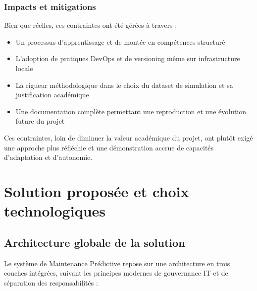 \documentclass[a4paper,12pt,twoside]{report}
\begin{document}
\subsection{Impacts et mitigations}

Bien que réelles, ces contraintes ont été gérées à travers :

\begin{itemize}
    \item Un processus d'apprentissage et de montée en compétences structuré
    \item L'adoption de pratiques DevOps et de versioning même sur infrastructure locale
    \item La rigueur méthodologique dans le choix du dataset de simulation et sa justification académique
    \item Une documentation complète permettant une reproduction et une évolution future du projet
\end{itemize}

Ces contraintes, loin de diminuer la valeur académique du projet, ont plutôt exigé une approche plus réfléchie et une démonstration accrue de capacités d'adaptation et d'autonomie.

\chapter{Solution proposée et choix technologiques}

\section{Architecture globale de la solution}

Le système de Maintenance Prédictive repose sur une architecture en trois couches intégrées, suivant les principes modernes de gouvernance IT et de séparation des responsabilités :
\end{document}
